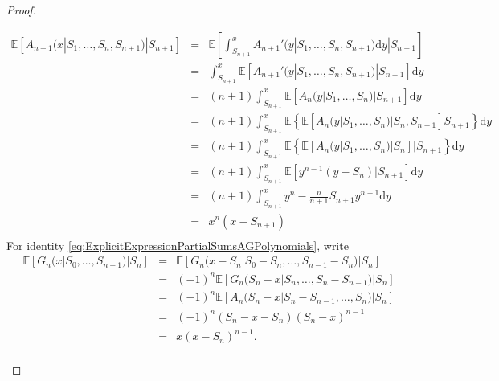 \begin{proof}
\begin{enumerate}
\begin{eqnarray*}
\mathbb{E}\left[A_{n+1}(x|S_1,\ldots, S_n,S_{n+1})|S_{n+1}\right]&=&\mathbb{E}\left[\int_{S_{n+1}}^x A_{n+1}'(y|S_1,\ldots, S_n,S_{n+1})\text{d}y|S_{n+1}\right]\\
&=&\int_{S_{n+1}}^x\mathbb{E}\left[ A_{n+1}'(y|S_1,\ldots, S_n,S_{n+1})|S_{n+1}\right]\text{d}y\\
&=&(n+1)\int_{S_{n+1}}^x\mathbb{E}\left[A_{n}(y|S_1,\ldots, S_n)|S_{n+1}\right]\text{d}y\\
&=&(n+1)\int_{S_{n+1}}^x\mathbb{E}\left\{\mathbb{E}\left[A_{n}(y|S_1,\ldots, S_n)|S_n,S_{n+1}\right]S_{n+1}\right\}\text{d}y\\
&=&(n+1)\int_{S_{n+1}}^x\mathbb{E}\left\{\mathbb{E}\left[A_{n}(y|S_1,\ldots, S_n)|S_n\right]|S_{n+1}\right\}\text{d}y\\
&=&(n+1)\int_{S_{n+1}}^x\mathbb{E}\left[y^{n-1}(y-S_n)|S_{n+1}\right]\text{d}y\\
&=&(n+1)\int_{S_{n+1}}^xy^n-\frac{n}{n+1}S_{n+1}y^{n-1} \text{d}y\\
&=&x^n(x-S_{n+1})\\
\end{eqnarray*}
For identity \eqref{eq:ExplicitExpressionPartialSumsAGPolynomials}, write 
\begin{eqnarray*}
\mathbb{E}\left[G_{n}(x|S_0,\ldots, S_{n-1})|S_{n}\right]&=&\mathbb{E}\left[G_{n}(x-S_n|S_0 - S_n,\ldots, S_{n-1}-S_n)|S_{n}\right]\\
&=&(-1)^n\mathbb{E}\left[G_{n}(S_n-x|S_n,\ldots, S_{n}-S_{n-1})|S_{n}\right]\\
&=&(-1)^n\mathbb{E}\left[A_{n}(S_n-x|S_{n}-S_{n-1},\ldots, S_n)|S_{n}\right]\\
&=&(-1)^n(S_n-x -S_n)(S_n-x)^{n-1}\\
&=&x(x-S_n)^{n-1}.\\
\end{eqnarray*}
\end{enumerate}
\end{proof}


